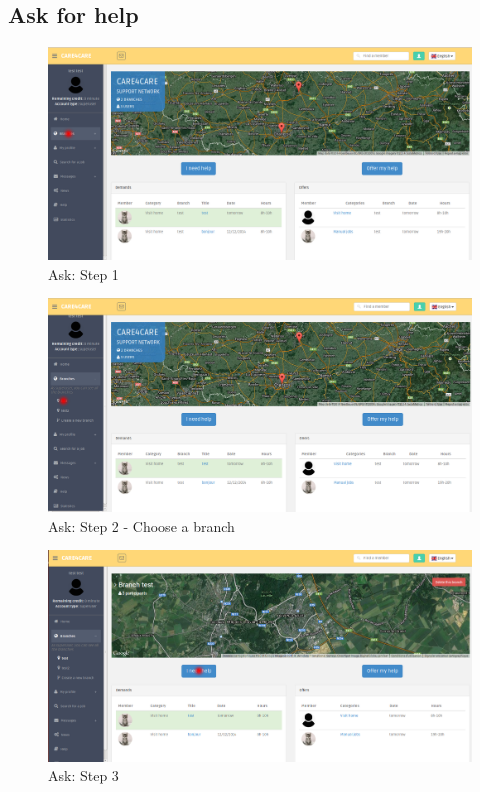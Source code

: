 \documentclass{article}
\begin{document}
\clearpage
\subsection{Ask for help}

\begin{figure}[!ht]
   \includegraphics[width=\textwidth]{img/dem1.png}
   \caption{Ask: Step 1}
\end{figure}
\begin{figure}[!ht]
   \includegraphics[width=\textwidth]{img/dem2.png}
   \caption{Ask: Step 2 - Choose a branch}
\end{figure}
\begin{figure}[!ht]
   \includegraphics[width=\textwidth]{img/dem3.png}
   \caption{Ask: Step 3}
\end{figure}
\end{document}

